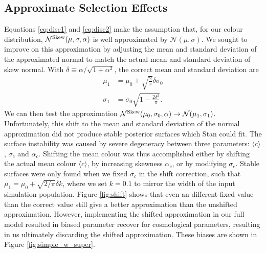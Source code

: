 \documentclass[a4paper,fleqn,usenatbib]{mnras}
\begin{document}
\subsection{Approximate Selection Effects}
\label{app:approx}

Equations \eqref{eq:disc1} and \eqref{eq:disc2} make the assumption that, for our colour distribution, $\mathcal{N}^{\rm Skew}(\mu, \sigma, \alpha)$ is well approximated by $\mathcal{N}(\mu, \sigma)$. We sought to improve on this approximation by adjusting the mean and standard deviation of the approximated normal to match the actual mean and standard deviation of skew normal. With $\delta \equiv \alpha/\sqrt{1+\alpha^2}$, the correct mean and standard deviation are
\begin{align}
\mu_1 &= \mu_0 + \sqrt{\frac{2}{\pi}} \delta \sigma_0 \\
\sigma_1 &= \sigma_0 \sqrt{1 - \frac{2 \delta^2}{\pi}}.
\end{align}
We can then test the approximation $\mathcal{N}^{\rm Skew}(\mu_0, \sigma_0, \alpha) \rightarrow \mathcal{N}(\mu_1, \sigma_1)$. Unfortunately, this shift to the mean and standard deviation of the normal approximation did not produce stable posterior surfaces which Stan could fit. The surface instability was caused by severe degeneracy between three parameters: $\langle c \rangle$, $\sigma_c$ and $\alpha_c$. Shifting the mean colour was thus accomplished either by shifting the actual mean colour $\langle c \rangle$, by increasing skewness $\alpha_c$, or by modifying $\sigma_c$. Stable surfaces were only found when we fixed $\sigma_c$ in the shift correction, such that $\mu_1 = \mu_0 + \sqrt{2/\pi}\delta k$, where we set $k=0.1$ to mirror the width of the input simulation population. Figure \ref{fig:shift} shows that even an different fixed value than the correct value still give a better approximation than the unshifted approximation. However, implementing the shifted approximation in our full model resulted in biased parameter recover for cosmological parameters, resulting in us ultimately discarding the shifted approximation. These biases are shown in Figure \ref{fig:simple_w_super}.
\end{document}
